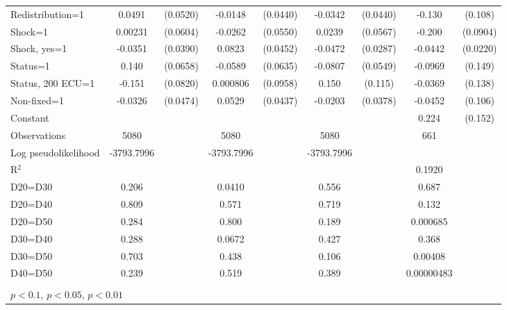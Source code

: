 \begin{tabular}{l|cccccc|cc}
Redistribution=1&   0.0491         & (0.0520)&  -0.0148         & (0.0440)&  -0.0342         & (0.0440)&   -0.130         &  (0.108)\\
Shock=1         &  0.00231         & (0.0604)&  -0.0262         & (0.0550)&   0.0239         & (0.0567)&   -0.200\sym{**} & (0.0904)\\
Shock, yes=1    &  -0.0351         & (0.0390)&   0.0823\sym{*}  & (0.0452)&  -0.0472         & (0.0287)&  -0.0442\sym{**} & (0.0220)\\
Status=1        &    0.140\sym{**} & (0.0658)&  -0.0589         & (0.0635)&  -0.0807         & (0.0549)&  -0.0969         &  (0.149)\\
Status, 200 ECU=1&   -0.151\sym{*}  & (0.0820)& 0.000806         & (0.0958)&    0.150         &  (0.115)&  -0.0369         &  (0.138)\\
Non-fixed=1     &  -0.0326         & (0.0474)&   0.0529         & (0.0437)&  -0.0203         & (0.0378)&  -0.0452         &  (0.106)\\
Constant        &                  &         &                  &         &                  &         &    0.224         &  (0.152)\\
\hline
Observations    &     5080         &         &     5080         &         &     5080         &         &      661         &         \\
Log pseudolikelihood  & -3793.7996   &         &     -3793.7996             &         &     -3793.7996             &         &           &   \\ 
R$^2$      &                  &         &                  &         &                  &         &   0.1920       &   \\ 

D20=D30         &    0.206         &         &   0.0410         &         &    0.556         &         &    0.687         &         \\
D20=D40         &    0.809         &         &    0.571         &         &    0.719         &         &    0.132         &         \\
D20=D50         &    0.284         &         &    0.800         &         &    0.189         &         & 0.000685         &         \\
D30=D40         &    0.288         &         &   0.0672         &         &    0.427         &         &    0.368         &         \\
D30=D50         &    0.703         &         &    0.438         &         &    0.106         &         &  0.00408         &         \\
D40=D50         &    0.239         &         &    0.519         &         &    0.389         &         &0.00000483         &         \\
\hline\hline
\multicolumn{9}{p{16cm}}{\tiny }\\
\multicolumn{9}{l}{\tiny \sym{*} \(p<0.1\), \sym{**} \(p<0.05\), \sym{***} \(p<0.01\)}\\
\end{tabular}